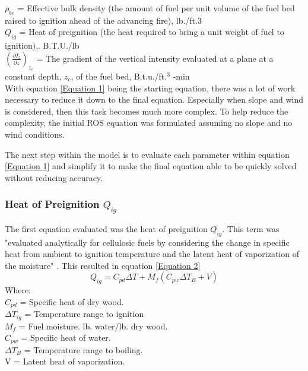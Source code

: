 \documentclass{article}
\begin{document}
\noindent $\rho_{be}$ = Effective bulk density (the amount of fuel per unit volume of the fuel bed raised to ignition ahead of the advancing fire), lb./ft.3 \\

\noindent $Q_{ig}$ = Heat of preignition (the heat required to bring a unit weight of fuel to ignition),. B.T.U./lb \\

\noindent $(\frac {\partial {I_z}} {\partial z})_{z_c}$ = The gradient of the vertical intensity evaluated at a plane at a constant depth, $z_c$, of the fuel bed, B.t.u./ft.$^3$ -min \\


\indent With equation \ref{Equation 1} being the starting equation, there was a lot of work necessary to reduce it down to the final equation. Especially when slope and wind is considered, then this task becomes much more complex. To help reduce the complexity, the initial ROS equation was formulated assuming no slope and no wind conditions. 

\indent The next step within the model is to evaluate each parameter within equation \ref{Equation 1} and simplify it to make the final equation able to be quickly solved without reducing accuracy. \\
\subsubsection{Heat of Preignition $Q_{ig}$}
\indent The first equation evaluated was the heat of preignition $Q_{ig}$. This term was "evaluated analytically for cellulosic fuels by considering the change in specific heat from ambient to ignition temperature and the latent heat of vaporization of the moisture" \citep{Rothermel1972}. This resulted in equation \ref{Equation 2}
\begin{equation}
	Q_{ig} = C_{pd}\Delta T + M_f (C_{pw} \Delta T_B + V)
	\label{Equation 2}
\end{equation}
Where: \\
$C_{pd}$ = Specific heat of dry wood. \\
$\Delta T_{ig}$ = Temperature range to ignition \\
$M_f$ = Fuel moisture. lb. water/lb. dry wood. \\
$C_{pw}$ = Specific heat of water. \\
$\Delta T_B$ = Temperature range to boiling. \\
V = Latent heat of vaporization. \\
\end{document}
